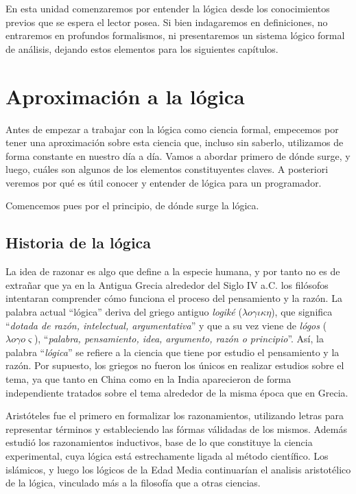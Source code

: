 En esta unidad comenzaremos por entender la lógica desde los conocimientos
previos que se espera el lector posea. Si bien indagaremos en definiciones, no
entraremos en profundos formalismos, ni presentaremos un sistema lógico formal
de análisis, dejando estos elementos para los siguientes capítulos.

\section{Aproximación a la lógica}
\label{chap:logica:sec:aproximacion}

Antes de empezar a trabajar con la lógica como ciencia formal, empecemos por
tener una aproximación sobre esta ciencia que, incluso sin saberlo, utilizamos
de forma constante en nuestro día a día. Vamos a abordar primero de dónde surge,
y luego, cuáles son algunos de los elementos constituyentes claves. A posteriori
veremos por qué es útil conocer y entender de lógica para un programador.

Comencemos pues por el principio, de dónde surge la lógica.

\subsection{Historia de la lógica}
\label{chap:logica:subsec:historia_logica}

La idea de razonar es algo que define a la especie humana, y por tanto no es
de extrañar que ya en la Antigua Grecia alrededor del Siglo IV a.C. los
filósofos intentaran comprender cómo funciona el proceso del pensamiento y la
razón. La palabra actual ``lógica'' deriva del griego antiguo \textit{logiké}
($\lambda o \gamma \iota \kappa \eta$), que significa ``\textit{dotada de razón,
intelectual, argumentativa}''  y que a su vez viene de \textit{lógos} ($\lambda
o \gamma o \varsigma$), ``\textit{palabra, pensamiento, idea, argumento, razón o
principio}''. Así, la palabra ``\textit{lógica}'' se refiere a la ciencia que
tiene por estudio el pensamiento y la razón. Por supuesto, los griegos no fueron
los únicos en realizar estudios sobre el tema, ya que tanto en China como en la
India aparecieron de forma independiente tratados sobre el tema alrededor de la
misma época que en Grecia.

Aristóteles fue el primero en formalizar los
razonamientos, utilizando letras para representar términos y estableciendo las
fórmas válidadas de los mismos. Además estudió los razonamientos inductivos,
base de lo que constituye la ciencia experimental, cuya lógica está
estrechamente ligada al método científico. Los islámicos, y luego los lógicos de
la Edad Media continuarían el analisis aristotélico de la lógica, vinculado más
a la filosofía que a otras ciencias.

